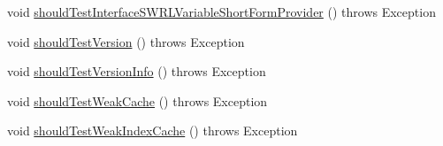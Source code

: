 \begin{DoxyCompactItemize}
\item 
void \hyperlink{classorg_1_1semanticweb_1_1owlapi_1_1contract_1_1_contract_owlapi_util_test_a467e3426a3d5690e2b8e75290484c31c}{should\-Test\-Interface\-S\-W\-R\-L\-Variable\-Short\-Form\-Provider} ()  throws Exception 
\item 
void \hyperlink{classorg_1_1semanticweb_1_1owlapi_1_1contract_1_1_contract_owlapi_util_test_acaa2baf4146a56e9c4fcf277d17ee623}{should\-Test\-Version} ()  throws Exception 
\item 
void \hyperlink{classorg_1_1semanticweb_1_1owlapi_1_1contract_1_1_contract_owlapi_util_test_a5f19e0a2c1b6bd6780db10b40b3273b2}{should\-Test\-Version\-Info} ()  throws Exception 
\item 
void \hyperlink{classorg_1_1semanticweb_1_1owlapi_1_1contract_1_1_contract_owlapi_util_test_a60b51cba6fe911a8a98cabfed6e929d4}{should\-Test\-Weak\-Cache} ()  throws Exception 
\item 
void \hyperlink{classorg_1_1semanticweb_1_1owlapi_1_1contract_1_1_contract_owlapi_util_test_a46ca0ca2e1ca88aaf1e88a214faa8e43}{should\-Test\-Weak\-Index\-Cache} ()  throws Exception 
\end{DoxyCompactItemize}


